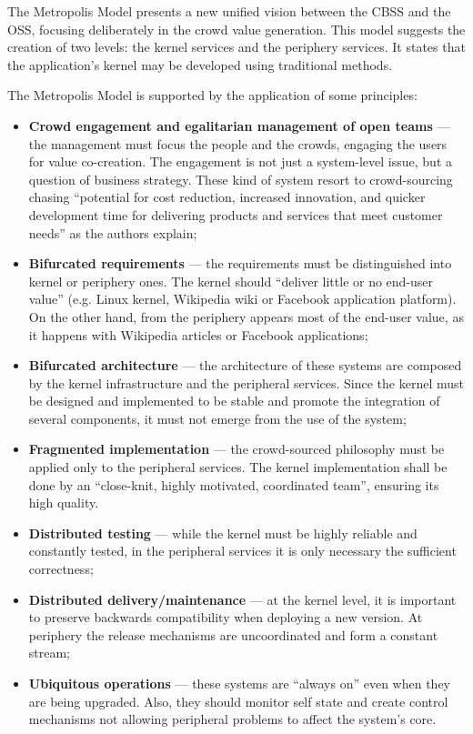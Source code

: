 The Metropolis Model presents a new unified vision between the CBSS and the OSS, focusing deliberately in the crowd value generation. This model suggests the creation of two levels: the kernel services and the periphery services. It states that the application's kernel may be developed using traditional methods.

The Metropolis Model is supported by the application of some principles:
\begin{itemize}
\item \textbf{Crowd engagement and egalitarian management of open teams} --- the management must focus the people and the crowds, engaging the users for value co-creation. The engagement is not just a system-level issue, but a question of business strategy. These kind of system resort to crowd-sourcing chasing ``potential for cost reduction, increased innovation, and quicker development time for delivering products and services that meet customer needs'' as the authors explain;
\item \textbf{Bifurcated requirements} --- the requirements must be distinguished into kernel or periphery ones. The kernel should ``deliver little or no end-user value'' (e.g. Linux kernel, Wikipedia wiki or Facebook application platform). On the other hand, from the periphery appears most of the end-user value, as it happens with Wikipedia articles or Facebook applications; 
\item \textbf{Bifurcated architecture} --- the architecture of these systems are composed by the kernel infrastructure and the peripheral services. Since the kernel must be designed and implemented to be stable and promote the integration of several components, it must not emerge from the use of the system;
\item \textbf{Fragmented implementation} --- the crowd-sourced philosophy must be applied only to the peripheral services. The kernel implementation shall be done by an ``close-knit, highly motivated, coordinated team'', ensuring its high quality.
\item \textbf{Distributed testing} --- while the kernel must be highly reliable and constantly tested, in the peripheral services it is only necessary the sufficient correctness;
\item \textbf{Distributed delivery/maintenance} --- at the kernel level, it is important to preserve backwards compatibility when deploying a new version. At periphery the release mechanisms are uncoordinated and form a constant stream;
\item \textbf{Ubiquitous operations} --- these systems are ``always on'' even when they are being upgraded. Also, they should monitor self state and create control mechanisms not allowing peripheral problems to affect the system's core. 
\end{itemize}


